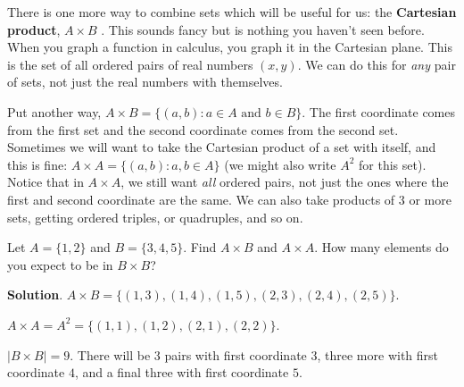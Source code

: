 \documentclass[11pt,]{book}
\newcommand{\terminology}[1]{\textbf{#1}}
\theoremstyle{ptxplainnotitle}
\theoremstyle{ptxplaintitle}
\theoremstyle{ptxdefinitionnotitle}
\theoremstyle{ptxdefinitiontitle}
\theoremstyle{ptxdefinitionnotitle}
\theoremstyle{ptxdefinitiontitle}
\theoremstyle{ptxdefinitionnotitle}
\theoremstyle{ptxdefinitiontitle}
\theoremstyle{ptxdefinitiontitlenonumber}
\theoremstyle{ptxdefinitiontitlenonumber}
\numberwithin{equation}{chapter}
\newcommand{\st}{:}
\begin{document}
\hypertarget{p-788}{}%
There is one more way to combine sets which will be useful for us: the \terminology{Cartesian product}, \(A \times B\)\label{notation-25}
. This sounds fancy but is nothing you haven't seen before. When you graph a function in calculus, you graph it in the Cartesian plane. This is the set of all ordered pairs of real numbers \((x,y)\). We can do this for \emph{any} pair of sets, not just the real numbers with themselves.%
\par
\hypertarget{p-789}{}%
Put another way, \(A \times B = \{(a,b) \st a \in A \text{ and } b \in B\}\). The first coordinate comes from the first set and the second coordinate comes from the second set. Sometimes we will want to take the Cartesian product of a set with itself, and this is fine: \(A \times A = \{(a,b) \st a, b \in A\}\) (we might also write \(A^2\) for this set). Notice that in \(A \times A\), we still want \emph{all} ordered pairs, not just the ones where the first and second coordinate are the same. We can also take products of 3 or more sets, getting ordered triples, or quadruples, and so on.%
\begin{example}\label{example-33}
\hypertarget{p-790}{}%
Let \(A = \{1,2\}\) and \(B = \{3,4,5\}\). Find \(A \times B\) and \(A \times A\). How many elements do you expect to be in \(B \times B\)?%
\par\smallskip%
\noindent\textbf{Solution}.\hypertarget{solution-105}{}\quad%
\hypertarget{p-791}{}%
\(A \times B = \{(1,3), (1,4), (1,5), (2,3), (2,4), (2,5)\}\).%
\par
\hypertarget{p-792}{}%
\(A \times A = A^2 = \{(1,1), (1,2), (2,1), (2,2)\}\).%
\par
\hypertarget{p-793}{}%
\(|B\times B| = 9\). There will be 3 pairs with first coordinate \(3\), three more with first coordinate \(4\), and a final three with first coordinate \(5\).%
\end{example}
\typeout{************************************************}
\typeout{************************************************}
\end{document}
